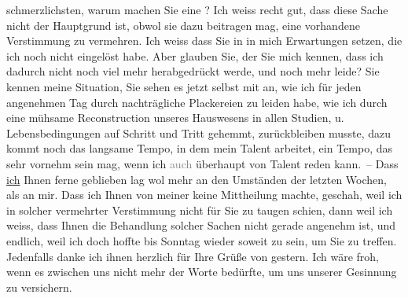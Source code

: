 \begin{ledgroupsized}[t]{13cm}
               schmerzlichsten, warum machen Sie eine \label{K_L03132-3v}\label{K_L03132-3h}? Ich
               weiss recht gut, dass diese Sache nicht der Hauptgrund ist, obwol sie dazu beitragen
               mag, eine vorhandene Verstimmung zu vermehren. Ich weiss dass Sie in \label{K_L03132-4v}\label{K_L03132-4h} in mich Erwartungen setzen, die ich noch nicht eingelöst habe. Aber glauben
               Sie, der Sie mich kennen, dass ich dadurch nicht noch viel mehr herabgedrückt werde,
               und noch mehr leide? Sie kennen meine Situation, Sie sehen es jetzt selbst mit an,
               wie ich für jeden ange{\pb}nehmen Tag durch nachträgliche Plackereien zu leiden habe, wie ich durch eine
               mühsame Reconstruction unseres Hauswesens in allen Studien, u. Lebensbedingungen auf
               Schritt und Tritt gehemmt, zurückbleiben musste, dazu kommt noch das langsame Tempo,
               in dem mein Talent arbeitet, ein Tempo, das sehr
               vornehm sein mag, wenn ich \introOben{}\textcolor{gray}{auch}\introOben{} überhaupt von Talent reden kann. –\pend
           \pstart
           Dass \uline{ich} Ihnen ferne geblieben
               lag wol mehr an den Umständen der letzten Wochen, als an mir. Dass ich Ihnen von
               meiner \label{K_L03132-5v}\label{K_L03132-5h} keine Mittheilung
               machte, geschah, weil ich in solcher vermehrter {\pb}Verstimmung nicht für Sie zu
               taugen schien, dann weil ich weiss, dass Ihnen die Behandlung solcher Sachen nicht
               gerade angenehm ist, und endlich, weil ich doch hoffte bis Sonntag wieder soweit zu sein, um Sie zu treffen.\pend
           \pstart
           Jedenfalls danke ich ihnen herzlich für Ihre Grüße von gestern. Ich wäre froh, wenn es zwischen uns nicht mehr der Worte
               bedürfte, um uns unserer Gesinnung zu versichern.

\end{ledgroupsized}
